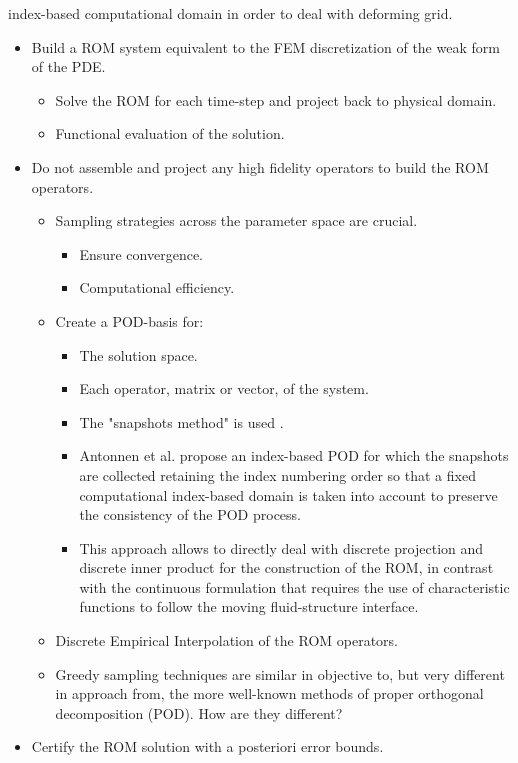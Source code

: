 \documentclass[../main.tex]{subfiles}
\begin{document}
index-based computational domain in order to deal with deforming grid.

\begin{itemize}
    \item Build a ROM system equivalent to the FEM discretization of the weak form of the PDE.
    \begin{itemize}
        \item Solve the ROM for each time-step and project back to physical domain.
        \item Functional evaluation of the solution.
    \end{itemize}
    \item Do not assemble and project any high fidelity operators to build the ROM operators.
    \begin{itemize}
        \item Sampling strategies across the parameter space are crucial.
            \begin{itemize}
                \item Ensure convergence.
                \item Computational efficiency.
            \end{itemize}
        \item Create a POD-basis for:
        \begin{itemize}
            \item The solution space.
            \item Each operator, matrix or vector, of the system.
            \item The "snapshots method" is used \cite{1987_turbulenceDynamicsCoherentStructures_Sirovich}.
            \item Antonnen et al. \cite{2003_podBasedReducedOrderModelsWithDeformingGrids_anttonen} propose an index-based POD for which the snapshots are collected retaining the index numbering order so that a fixed computational index-based domain is taken into account to preserve the consistency of the POD process.
            \item This approach allows to directly deal with discrete projection and discrete inner product for the construction of the ROM, in contrast with the continuous formulation that requires the use of characteristic functions to follow the moving fluid-structure interface.
        \end{itemize}
        \item Discrete Empirical Interpolation of the ROM operators.
        \item Greedy sampling techniques are similar in objective to, but very different in approach from, the more well-known methods of proper orthogonal decomposition (POD). How are they different?
    \end{itemize}
    \item Certify the ROM solution with a posteriori error bounds.
\end{itemize}
\end{document}
